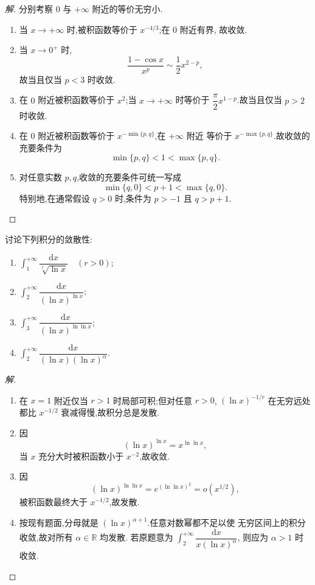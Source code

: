 \documentclass[../../数学分析培优讲义(答案版).tex]{subfiles}
\begin{document}
\begin{proof}[解]
分别考察 $0$ 与 $+\infty$ 附近的等价无穷小.
\begin{enumerate}[label=(\arabic*)]
    \item 当 $x\to+\infty$ 时,被积函数等价于 $x^{-4/3}$;在 $0$ 附近有界,
    故收敛.
    \item 当 $x\to0^+$ 时,
    \[
        \dfrac{1-\cos x}{x^p}\sim\dfrac{1}{2}x^{2-p},
    \]
    故当且仅当 $p<3$ 时收敛.
    \item 在 $0$ 附近被积函数等价于 $x^2$;当 $x\to+\infty$ 时等价于
    $\dfrac{\pi}{2}x^{1-p}$.故当且仅当 $p>2$ 时收敛.
    \item 在 $0$ 附近被积函数等价于 $x^{-\min\{p,q\}}$,在 $+\infty$ 附近
    等价于 $x^{-\max\{p,q\}}$.故收敛的充要条件为
    \[
        \min\{p,q\}<1<\max\{p,q\}.
    \]
    \item 对任意实数 $p,q$,收敛的充要条件可统一写成
    \[
        \min\{q,0\}<p+1<\max\{q,0\}.
    \]
    特别地,在通常假设 $q>0$ 时,条件为 $p>-1$ 且 $q>p+1$.
\end{enumerate}
\end{proof}

\begin{example}
讨论下列积分的敛散性:
\begin{enumerate}[label=(\arabic*)]
    \item $\displaystyle\int_1^{+\infty}\dfrac{\mathrm{d}x}{\sqrt[r]{\ln x}}\quad(r>0)$;
    \item $\displaystyle\int_2^{+\infty}\dfrac{\mathrm{d}x}{(\ln x)^{\ln x}}$;
    \item $\displaystyle\int_3^{+\infty}\dfrac{\mathrm{d}x}{(\ln x)^{\ln\ln x}}$;
    \item $\displaystyle\int_2^{+\infty}\dfrac{\mathrm{d}x}{(\ln x)(\ln x)^\alpha}$.
\end{enumerate}
\end{example}

\begin{proof}[解]
\begin{enumerate}[label=(\arabic*)]
    \item 在 $x=1$ 附近仅当 $r>1$ 时局部可积;但对任意 $r>0$,
    $(\ln x)^{-1/r}$ 在无穷远处都比 $x^{-1/2}$ 衰减得慢,故积分总是发散.
    \item 因
    \[
        (\ln x)^{\ln x}=x^{\ln\ln x},
    \]
    当 $x$ 充分大时被积函数小于 $x^{-2}$,故收敛.
    \item 因
    \[
        (\ln x)^{\ln\ln x}=e^{(\ln\ln x)^2}=o(x^{1/2}),
    \]
    被积函数最终大于 $x^{-1/2}$,故发散.
    \item 按现有题面,分母就是 $(\ln x)^{\alpha+1}$.任意对数幂都不足以使
    无穷区间上的积分收敛,故对所有 $\alpha\in\mathbb{R}$ 均发散.
    若原题意为 $\displaystyle\int_2^{+\infty}\dfrac{\mathrm{d}x}{x(\ln x)^\alpha}$,
    则应为 $\alpha>1$ 时收敛.
\end{enumerate}
\end{proof}
\end{document}

